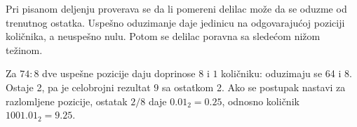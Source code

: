 Pri pisanom deljenju proverava se da li pomereni delilac može da se oduzme od trenutnog ostatka. Uspešno oduzimanje daje jedinicu na odgovarajućoj poziciji količnika, a neuspešno nulu. Potom se delilac poravna sa sledećom nižom težinom.

Za $74:8$ dve uspešne pozicije daju doprinose $8$ i $1$ količniku: oduzimaju se 64 i 8. Ostaje 2, pa je celobrojni rezultat $9$ sa ostatkom 2. Ako se postupak nastavi za razlomljene pozicije, ostatak $2/8$ daje $0.01_2=0.25$, odnosno količnik $1001.01_2=9.25$.
